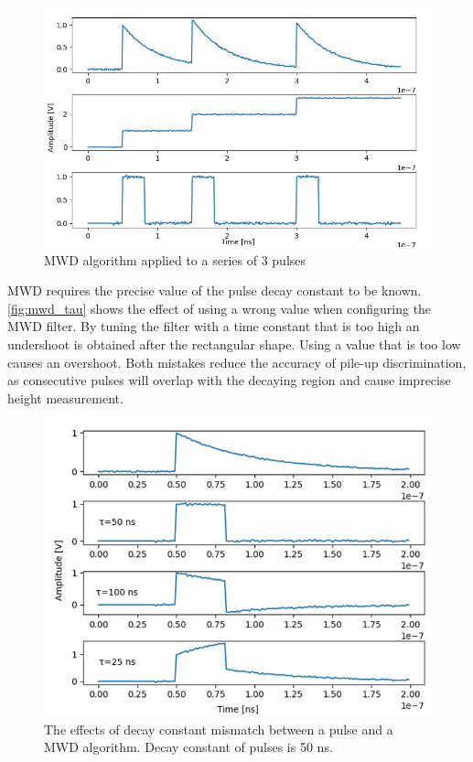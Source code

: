 \begin{figure}[H]
  \centering
  \includegraphics[width=\linewidth]{media/mwd_staircase.png}
  \caption{MWD algorithm applied to a series of 3 pulses}
  \label{fig:mwd_staircase} 
\end{figure}


MWD requires the precise value of the pulse decay constant to
be known. \autoref{fig:mwd_tau} shows the effect of using a wrong value
when configuring the MWD filter. By tuning the filter with a time constant
that is too high an undershoot is obtained after the rectangular shape.
Using a value that is too low causes an overshoot.
Both mistakes reduce the accuracy of pile-up discrimination, 
as consecutive pulses will overlap with the decaying region
and cause imprecise height measurement.

\begin{figure}[H]
  \centering
  \includegraphics[width=\linewidth]{media/mwd_tau.png}
  \caption{The effects of decay constant mismatch between a pulse and a MWD algorithm. Decay constant of pulses is 50 ns.}
  \label{fig:mwd_tau} 
\end{figure}

